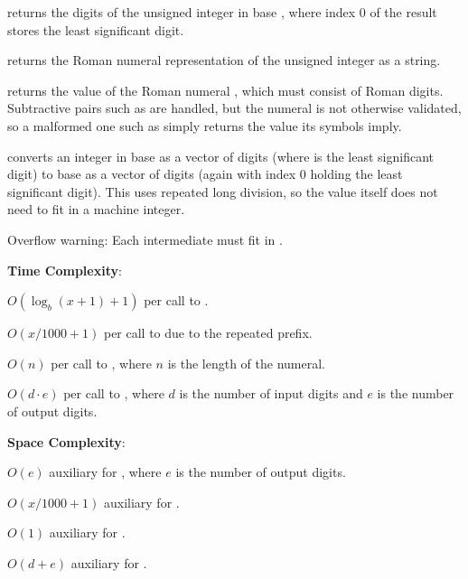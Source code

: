\begin{compactitem}
  \item {} returns the digits of the unsigned integer  in base , where index $0$ of the result stores the least significant digit.
  \item {} returns the Roman numeral representation of the unsigned integer  as a string.
  \item {} returns the value of the Roman numeral , which must consist of Roman digits. Subtractive pairs such as  are handled, but the numeral is not otherwise validated, so a malformed one such as  simply returns the value its symbols imply.
  \item {} converts an integer in base  as a vector  of digits (where  is the least significant digit) to base  as a vector of digits (again with index $0$ holding the least significant digit). This uses repeated long division, so the value itself does not need to fit in a machine integer.
\end{compactitem}

Overflow warning: Each intermediate  must fit in .

\textbf{Time Complexity}:
\begin{compactitem}
  \item $O(\log_{b}\left(x + 1\right) + 1)$ per call to .
  \item $O(x / 1000 + 1)$ per call to  due to the repeated  prefix.
  \item $O(n)$ per call to , where $n$ is the length of the numeral.
  \item $O(d \cdot e)$ per call to , where $d$ is the number of input digits and $e$ is the number of output digits.
\end{compactitem}

\textbf{Space Complexity}:
\begin{compactitem}
  \item $O(e)$ auxiliary for , where $e$ is the number of output digits.
  \item $O(x / 1000 + 1)$ auxiliary for .
  \item $O(1)$ auxiliary for .
  \item $O(d + e)$ auxiliary for .
\end{compactitem}

